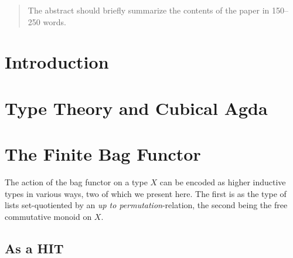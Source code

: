 \documentclass[runningheads]{llncs}
\begin{document}
\maketitle              %

\begin{abstract}
The abstract should briefly summarize the contents of the paper in
150--250 words.

\end{abstract}

\section{Introduction}

\section{Type Theory and Cubical Agda}

\section{The Finite Bag Functor}

The action of the bag functor on a type $X$ can be encoded as higher inductive
types in various ways, two of which we present here.
The first is as the type of lists set-quotiented by an \emph{up to permutation}-relation,
the second being the free commutative monoid on $X$.


\subsection{As a HIT}
\end{document}
